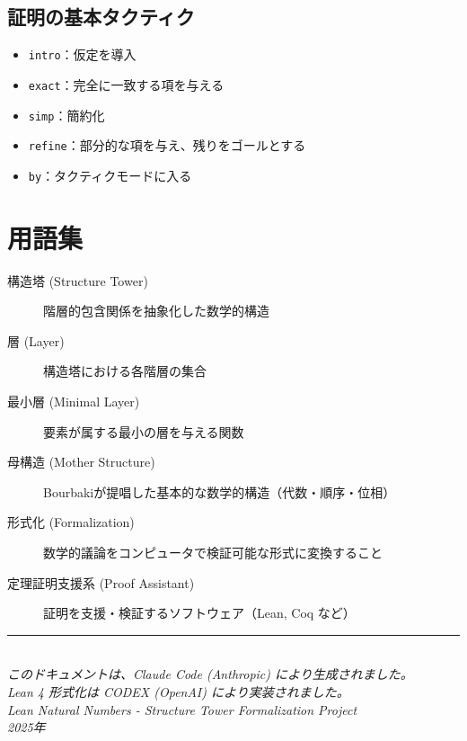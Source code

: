 \documentclass[a4paper,11pt]{ltjsarticle}
\begin{document}
\subsection{証明の基本タクティク}

\begin{itemize}
\item \texttt{intro}：仮定を導入
\item \texttt{exact}：完全に一致する項を与える
\item \texttt{simp}：簡約化
\item \texttt{refine}：部分的な項を与え、残りをゴールとする
\item \texttt{by}：タクティクモードに入る
\end{itemize}

\section{用語集}

\begin{description}
\item[構造塔 (Structure Tower)] 階層的包含関係を抽象化した数学的構造
\item[層 (Layer)] 構造塔における各階層の集合
\item[最小層 (Minimal Layer)] 要素が属する最小の層を与える関数
\item[母構造 (Mother Structure)] Bourbakiが提唱した基本的な数学的構造（代数・順序・位相）
\item[形式化 (Formalization)] 数学的議論をコンピュータで検証可能な形式に変換すること
\item[定理証明支援系 (Proof Assistant)] 証明を支援・検証するソフトウェア（Lean, Coq など）
\end{description}

\vfill

\begin{center}
\rule{0.8\textwidth}{0.4pt}\\[1em]
\textit{このドキュメントは、Claude Code (Anthropic) により生成されました。}\\
\textit{Lean 4 形式化は CODEX (OpenAI) により実装されました。}\\
\textit{Lean Natural Numbers - Structure Tower Formalization Project}\\
\textit{2025年}
\end{center}
\end{document}
